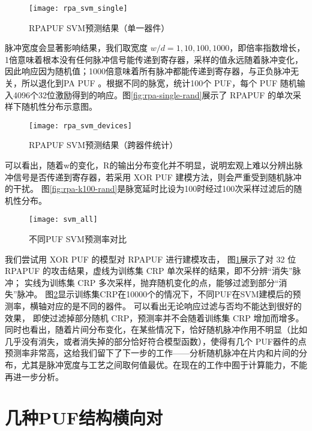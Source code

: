 \begin{figure}[htb!]
\centering
\texttt{[image: rpa\_svm\_single]}
\caption{RPAPUF SVM预测结果（单一器件）}
\label{fig:rpa-svm}
\end{figure}


脉冲宽度会显著影响结果，我们取宽度 $ w/d={1,10,100,1000} $，即倍率指数增长，1倍意味着根本没有任何脉冲信号能传递到寄存器，采样的值永远随着脉冲变化，因此响应因为随机值；1000倍意味着所有脉冲都能传递到寄存器，与正负脉冲无关，所以退化到PA PUF 。根据不同的脉宽，统计100个 PUF，每个 PUF 随机输入4096个32位激励得到的响应。图\ref{fig:rpa-single-rand}展示了 RPAPUF 的单次采样下随机性分布示意图。

\begin{figure}[htb!]
\centering
\texttt{[image: rpa\_svm\_devices]}
\caption{RPAPUF SVM预测结果（跨器件统计）}
\label{fig:rpa-svm-devices}
\end{figure}

可以看出，随着w的变化，R的输出分布变化并不明显，说明宏观上难以分辨出脉冲信号是否传递到寄存器，若采用 XOR PUF 建模方法，则会严重受到随机脉冲的干扰。
图\ref{fig:rpa-k100-rand}是脉宽延时比设为100时经过100次采样过滤后的随机性分布。

\begin{figure}[htb!]
\centering
\texttt{[image: svm\_all]}
\caption{不同PUF SVM预测率对比}
\label{fig:svm_all}
\end{figure}

我们尝试用 XOR PUF 的模型对 RPAPUF 进行建模攻击， 图\ref{fig:rpa-svm}展示了对 32 位 RPAPUF 的攻击结果，虚线为训练集 CRP 单次采样的结果，即不分辨``消失''脉冲；
实线为训练集 CRP 多次采样，抛弃随机变化的点，能够过滤到部分``消失''脉冲。
图\ref{fig:rpa-svm-devices}显示训练集CRP在10000个的情况下，不同PUF在SVM建模后的预测率，横轴对应的是不同的器件。
可以看出无论响应过滤与否均不能达到很好的效果， 即使过滤掉部分随机 CRP，预测率并不会随着训练集 CRP 增加而增多。
同时也看出，随着片间分布变化，在某些情况下，恰好随机脉冲作用不明显（比如几乎没有消失，或者消失掉的部分恰好符合模型函数），使得有几个 PUF器件的点预测率非常高，这给我们留下了下一步的工作——分析随机脉冲在片内和片间的分布，尤其是脉冲宽度与工艺之间取何值最优。在现在的工作中囿于计算能力，不能再进一步分析。



\section{几种PUF结构横向对}\label{sec:rpa_summary}

